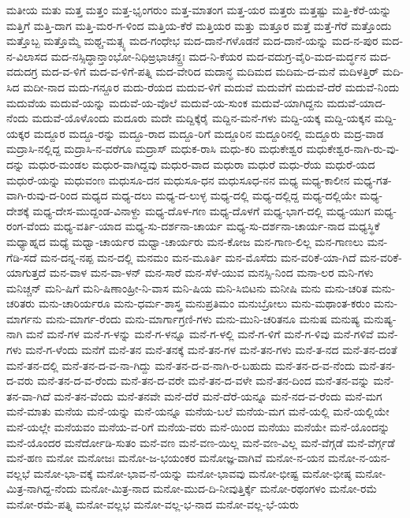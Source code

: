 ಮತೀಯ
ಮತು
ಮತ್ತ
ಮತ್ತಂ
ಮತ್ತ-ಭೃಂಗರುಂ
ಮತ್ತ-ಮಾತಂಗ
ಮತ್ತ-ಯರ
ಮತ್ತರು
ಮತ್ತಷ್ಟು
ಮತ್ತಿ-ಕೆರೆ-ಯನ್ನು
ಮತ್ತಿಗೆ
ಮತ್ತಿ-ದಾಗ
ಮತ್ತಿ-ಮರ-ಗ-ಳಿಂದ
ಮತ್ತಿಯ-ಕೆರೆ
ಮತ್ತಿಯರ
ಮತ್ತು
ಮತ್ತೂರ
ಮತ್ತೆ
ಮತ್ತೆ-ಗೆರೆ
ಮತ್ತೊಂದು
ಮತ್ತೊಬ್ಬ
ಮತ್ತೊಮ್ಮೆ
ಮಥ್ಚ-ಮತ್ಸ್ಯ
ಮದ-ಗಂಧೇಭ
ಮದ-ದಾನೆ-ಗಳೊಡನೆ
ಮದ-ದಾನೆ-ಯನ್ನು
ಮದ-ನ-ಪುರ
ಮದ-ನ-ವಿಲಾಸದ
ಮದ-ನಸ್ಸಿದ್ಧಾನ್ತಾಂಭೋ-ನಿಧಿಱ್ರಭಾಚನ್ದ್ರಃ
ಮದ-ನಿ-ಕೆಯರ
ಮದ-ವದುಗ್ರ-ವೈರಿ-ಮದ-ಮರ್ದ್ಧನ
ಮದ-ವದುದಗ್ರ
ಮದ-ವ-ಳಿಗೆ
ಮದ-ವ-ಳಿಗೆ-ಪತ್ನಿ
ಮದ-ವೇರಿದ
ಮದಾನ್ಧ
ಮದಿಮದ
ಮದಿಮ-ದ-ಮನೆ
ಮದಿಳತ್ತಿರ್
ಮದಿ-ಸಿದ
ಮದೀ-ನಾದ
ಮದು-ಗನ್ದೂರ
ಮದು-ರೆಯದ
ಮದುವ-ಳಿಗೆ
ಮದುವೆ
ಮದುವೆಗೆ
ಮದುವೆ-ದೆರೆ
ಮದುವೆ-ನಿಂದು
ಮದುವೆಯ
ಮದುವೆ-ಯನ್ನು
ಮದುವೆ-ಯ-ವೊಲೆ
ಮದುವೆ-ಯ-ಸುಂಕ
ಮದುವೆ-ಯಾಗಿದ್ದನು
ಮದುವೆ-ಯಾದ-ನೆಂದು
ಮದುವೆ-ಯೊಳೊಂದು
ಮದೂರು
ಮದೇ
ಮದ್ದಿಕ್ಕೆರೈ
ಮದ್ದಿನ-ಮನೆ-ಗಳು
ಮದ್ದಿ-ಯಕ್ಕ
ಮದ್ದಿ-ಯಕ್ಕನ
ಮದ್ದಿ-ಯಕ್ಕರ
ಮದ್ದೂರ
ಮದ್ದೂ-ರನ್ನು
ಮದ್ದೂ-ರಾದ
ಮದ್ದೂ-ರಿಗೆ
ಮದ್ದೂರಿನ
ಮದ್ದೂರಿನಲ್ಲಿ
ಮದ್ದೂರು
ಮದ್ರ-ವಾಡ
ಮದ್ರಾಸಿ-ನಲ್ಲಿದ್ದ
ಮದ್ರಾಸಿ-ನ-ವರೆಗೂ
ಮದ್ರಾಸ್
ಮಧುಕ-ರಾಸಿ
ಮಧು-ಕರಿ
ಮಧುಕೇಶ್ವರ
ಮಧುಕೇಶ್ವರ-ನಾಗಿ-ರು-ವು-ದನ್ನು
ಮಧುರ-ಮಂಡಲ
ಮಧುರ-ವಾಗಿದ್ದವು
ಮಧುರ-ವಾದ
ಮಧುರಾ
ಮಧುರೆ
ಮಧು-ರೆಯ
ಮಧುರೆ-ಯದ
ಮಧುರೆ-ಯನ್ನು
ಮಧುವಂಣ
ಮಧುಸೂ-ದನ
ಮಧುಸೂ-ಧನ
ಮಧುಸೂಧ-ನನ
ಮಧ್ಯ
ಮಧ್ಯ-ಕಾಲೀನ
ಮಧ್ಯ-ಗತ-ವಾಗಿ-ರುವು-ದ-ರಿಂದ
ಮಧ್ಯದ
ಮಧ್ಯ-ದಲು
ಮಧ್ಯ-ದ-ಲುಳ್ಳ
ಮಧ್ಯ-ದಲ್ಲಿ
ಮಧ್ಯ-ದಲ್ಲಿದ್ದ
ಮಧ್ಯ-ದಲ್ಲಿಯೇ
ಮಧ್ಯ-ದೇಶಕ್ಕೆ
ಮಧ್ಯ-ದೇಸ-ಮುದ್ದಂಡ-ವಿನಾಳ್ದು
ಮಧ್ಯ-ದೊಳ-ಗಣ
ಮಧ್ಯ-ದೊಳಗೆ
ಮಧ್ಯ-ಭಾಗ-ದಲ್ಲಿ
ಮಧ್ಯ-ಯುಗ
ಮಧ್ಯ-ರಂಗ-ವೆಂದು
ಮಧ್ಯ-ವರ್ತಿ-ಯಾದ
ಮಧ್ಯ-ಸು-ದರ್ಶನಾ-ಚಾರ್ಯ
ಮಧ್ಯ-ಸು-ದರ್ಶನಾ-ಚಾರ್ಯ-ನಾದ
ಮಧ್ಯಸ್ಥಿಕೆ
ಮಧ್ಯಾಹ್ನದ
ಮಧ್ಯೆ
ಮಧ್ವಾ-ಚಾರ್ಯರ
ಮಧ್ವಾ-ಚಾರ್ಯರು
ಮನ-ಕೋಜ
ಮನ-ಗಾಣ-ಲಿಲ್ಲ
ಮನ-ಗಾಣಲು
ಮನ-ಗೆಡಿ-ಸದೆ
ಮನ-ದನ್ನ-ನಪ್ಪ
ಮನ-ದಲ್ಲಿ
ಮನಮಂ
ಮನ-ಮೂರ್ತಿ
ಮನ-ಮೊಸೆದು
ಮನ-ವರಿಕೆ-ಯಾ-ಗಿದೆ
ಮನ-ವರಿಕೆ-ಯಾಗುತ್ತದೆ
ಮನ-ವಾಳ
ಮನ-ವಾ-ಳನ್
ಮನ-ಸಾರೆ
ಮನ-ಸೆಳೆ-ಯುವ
ಮನಸ್ಸಿ-ನಿಂದ
ಮನಾ-ಲರ
ಮನಿ-ಗಳು
ಮನಿಚ್ಚನ್
ಮನಿ-ಷಿಗೆ
ಮನಿ-ಷಿಣಾಂಹ್ರೀ-ನಿ-ವಾಸ
ಮನಿ-ಷಿಯ
ಮನಿ-ಸಿಬಿಟನು
ಮನೀಷಿ
ಮನು
ಮನು-ಚರಿತ
ಮನು-ಚರಿತರು
ಮನು-ಚಾರಿರ್ಯರೂ
ಮನು-ಧರ್ಮ-ಶಾಸ್ತ್ರ
ಮನುಪ್ರತಿಮಂ
ಮನುಬ್ರೋಲು
ಮನು-ಮಥಾಂತ-ಕರುಂ
ಮನು-ಮಾರ್ಗನು
ಮನು-ಮಾರ್ಗ-ರೆಂದು
ಮನು-ಮಾರ್ಗಾಗ್ರಣಿ-ಗಳು
ಮನು-ಮುನಿ-ಚರಿತನೂ
ಮನುಷ
ಮನುಷ್ಯ
ಮನುಷ್ಯ-ನಾಗಿ
ಮನೆ
ಮನೆ-ಗಳ
ಮನೆ-ಗ-ಳನ್ನು
ಮನೆ-ಗ-ಳನ್ನೂ
ಮನೆ-ಗ-ಳಲ್ಲಿ
ಮನೆ-ಗ-ಳಿಗೆ
ಮನೆ-ಗ-ಳಿವು
ಮನೆ-ಗಳಿವೆ
ಮನೆ-ಗಳು
ಮನೆ-ಗ-ಳೆಂದು
ಮನೆಗೆ
ಮನೆ-ತನ
ಮನೆ-ತನಕ್ಕೆ
ಮನೆ-ತನ-ಗಳ
ಮನೆ-ತನ-ಗಳು
ಮನೆ-ತ-ನದ
ಮನೆ-ತನ-ದಂತೆ
ಮನೆ-ತನ-ದಲ್ಲಿ
ಮನೆ-ತನ-ದ-ವ-ನಾ-ಗಿದ್ದು
ಮನೆ-ತನ-ದ-ವ-ನಾಗಿ-ರ-ಬಹುದು
ಮನೆ-ತನ-ದ-ವ-ನೆಂದು
ಮನೆ-ತನ-ದ-ವರು
ಮನೆ-ತನ-ದ-ವ-ರೆಂದು
ಮನೆ-ತನ-ದ-ವರೇ
ಮನೆ-ತನ-ದ-ವಳೇ
ಮನೆ-ತನ-ದಿಂದ
ಮನೆ-ತನ-ವನ್ನು
ಮನೆ-ತನ-ವಾ-ಗಿದೆ
ಮನೆ-ತನ-ವೆಂದು
ಮನೆ-ತನವೇ
ಮನೆ-ದೆರೆ
ಮನೆ-ದೆರೆ-ಯನ್ನೂ
ಮನೆ-ನದ-ವ-ರೆಂದು
ಮನೆ-ಮಗ
ಮನೆ-ಮಾತು
ಮನೆಯ
ಮನೆ-ಯನ್ನು
ಮನೆ-ಯನ್ನೂ
ಮನೆಯ-ಬಲೆ
ಮನೆಯ-ಮಗ
ಮನೆ-ಯಲ್ಲಿ
ಮನೆ-ಯಲ್ಲಿಯೇ
ಮನೆ-ಯಲ್ಲೇ
ಮನೆಯವಂ
ಮನೆಯ-ವ-ರಿಗೆ
ಮನೆಯ-ವರು
ಮನೆ-ಯಿಂದ
ಮನೆಯು
ಮನೆಯೇ
ಮನೆ-ಯೊಂದನ್ನು
ಮನೆ-ಯೊಂದರ
ಮನೆರ್ದೋಡಿ-ಸುತಂ
ಮನೆ-ವಣ
ಮನೆ-ವಣ-ಯಿಲ್ಲ
ಮನೆ-ವಣ-ವಿಲ್ಲ
ಮನೆ-ವೆಗ್ಗಡೆ
ಮನೆ-ವೆರ್ಗ್ಗಡೆ
ಮನೆ-ಹಣ
ಮನೋ
ಮನೋಜಃ
ಮನೋ-ಜ-ಭಯಂಕರ
ಮನೋಜ್ಞ-ವಾಗಿವೆ
ಮನೋ-ನ-ಯನ
ಮನೋ-ನ-ಯನ-ವಲ್ಲಭೆ
ಮನೋ-ಭಾ-ವಕ್ಕೆ
ಮನೋ-ಭಾವ-ನೆ-ಯನ್ನು
ಮನೋ-ಭಾವವು
ಮನೋ-ಭೀಷ್ಟ
ಮನೋ-ಭೀಷ್ಠ
ಮನೋ-ಮಿತ್ರ-ನಾಗಿದ್ದ-ನೆಂದು
ಮನೋ-ಮಿತ್ರ-ನಾದ
ಮನೋ-ಮುದ-ದಿ-ನೀವುತ್ತಿರ್ಕ್ಕೆ
ಮನೋ-ರಥಂಗಳಂ
ಮನೋ-ರಮೆ
ಮನೋ-ರಮೆ-ಪತ್ನಿ
ಮನೋ-ವಲ್ಲಭ
ಮನೋ-ವಲ್ಲ-ಭ-ನಾದ
ಮನೋ-ವಲ್ಲ-ಭೆ-ಯರು
